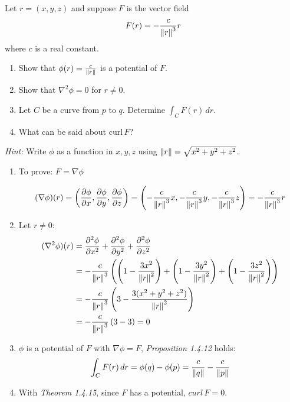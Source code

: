 \begin{exercise}
	Let $r = (x,y,z)$ and suppose $F$ is the vector field
	$$
		F(r) = - \frac{c}{\left\lVert r \right\rVert^3} r
	$$
	where $c$ is a real constant.
	\begin{enumerate}
		\item Show that $\phi(r) = \frac{c}{\left\lVert r \right\rVert}$ is a potential of $F$.

		\item Show that $\nabla^2 \phi = 0$ for $r \neq 0$.

		\item Let $C$ be a curve from $p$ to $q$. Determine $\int_C F(r) \, dr$.

		\item What can be said about $\mathrm{curl} \, F$?
	\end{enumerate}

	\emph{Hint:} Write $\phi$ as a function in $x, y, z$ using $\left\lVert r \right\rVert = \sqrt{x^2 + y^2 + z^2}$.
\end{exercise}

\begin{solution}
	\begin{enumerate}
		\item
		      To prove: $F = \nabla \phi$

		      $$
			      (\nabla \phi)(r) = \left( \frac{\partial \phi}{\partial x}, \frac{\partial \phi}{\partial y}, \frac{\partial \phi}{\partial z} \right)
			      = \left( -\frac{c}{\left\lVert r \right\rVert^3} x, -\frac{c}{\left\lVert r \right\rVert^3} y, -\frac{c}{\left\lVert r \right\rVert^3} z \right)
			      = - \frac{c}{\left\lVert r \right\rVert^3} r
		      $$

		\item Let $r \neq 0$:
		      $$
			      \begin{aligned}
				      (\nabla^2 \phi)(r) & = \frac{\partial^2 \phi}{\partial x^2} + \frac{\partial^2 \phi}{\partial y^2} + \frac{\partial^2 \phi}{\partial z^2}                                                     \\
				                         & = -\frac{c}{\left\lVert r \right\rVert^3} \left( \left(1 - \frac{3x^2}{\left\lVert r \right\rVert^2} \right) + \left(1 - \frac{3y^2}{\left\lVert r \right\rVert^2} \right) + \left(1 - \frac{3z^2}{\left\lVert r \right\rVert^2} \right) \right) \\
				                         & = -\frac{c}{\left\lVert r \right\rVert^3} \left( 3 - \frac{3(x^2+y^2+z^2)}{\left\lVert r \right\rVert^2} \right)                                                                                             \\
				                         & = -\frac{c}{\left\lVert r \right\rVert^3} \left( 3 - 3 \right) = 0
			      \end{aligned}
		      $$

		\item $\phi$ is a potential of $F$ with $\nabla \phi = F$, \emph{Proposition 1.4.12} holds:
		      $$
			      \int_C F(r) \, dr = \phi(q) - \phi(p) = \frac{c}{\left\lVert q \right\rVert} - \frac{c}{\left\lVert p \right\rVert}
		      $$

		\item With \emph{Theorem 1.4.15}, since $F$ has a potential, $curl \, F = 0$.
	\end{enumerate}
\end{solution}
